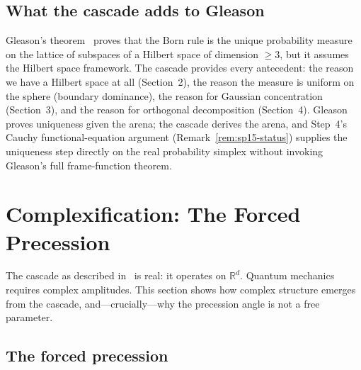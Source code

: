 \documentclass[12pt,a4paper]{article}
\begin{document}
\subsection{What the cascade adds to Gleason}

Gleason's theorem~\cite{gleason} proves that the Born rule is the unique probability measure
on the lattice of subspaces of a Hilbert space of dimension $\geq 3$, but it assumes the
Hilbert space framework. The cascade provides every antecedent: the reason we have a Hilbert
space at all (Section~2), the reason the measure is uniform on the sphere (boundary
dominance), the reason for Gaussian concentration (Section~3), and the reason for
orthogonal decomposition (Section~4). Gleason proves uniqueness given the arena; the
cascade derives the arena, and Step~4's Cauchy functional-equation argument
(Remark~\ref{rem:sp15-status}) supplies the uniqueness step directly on the
real probability simplex without invoking Gleason's full frame-function
theorem.

\section{Complexification: The Forced Precession}
\label{sec:complex}

The cascade as described in~\cite{part0} is real: it operates on $\mathbb{R}^d$. Quantum
mechanics requires complex amplitudes. This section shows how complex structure emerges from
the cascade, and---crucially---why the precession angle is not a free parameter.

\subsection{The forced precession}
\end{document}
